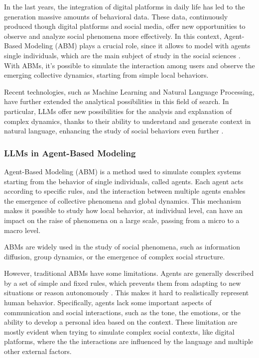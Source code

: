 In the last years, the integration of digital platforms in daily life has led to the generation massive amounts of behavioral data.
These data, continuously produced though digital platforms and social media, offer new opportunities to observe and analyze social phenomena more effectively.
In this context, Agent-Based Modeling (ABM) plays a crucial role, since it allows to model with agents single individuals, which are the main subject of study in the social sciences \cite{conte2012manifesto}.
With ABMs, it's possible to simulate the interaction among users and observe the emerging collective dynamics, starting from simple local behaviors.

Recent technologies, such as Machine Learning and Natural Language Processing, have further extended the analytical possibilities in this field of search.
In particular, LLMs offer new possibilities for the analysis and explanation of complex dynamics, thanks to their ability to understand and generate context in natural language, enhancing the study of social behaviors even further \cite{thapa2025llm}.


\subsubsection{LLMs in Agent-Based Modeling}
Agent-Based Modeling (ABM) is a method used to simulate complex systems starting from the behavior of single individuals, called agents.
Each agent acts according to specific rules, and the interaction between multiple agents enables the emergence of collective phenomena and global dynamics.
This mechanism makes it possible to study how local behavior, at individual level, can have an impact on the raise of phenomena on a large scale, passing from a micro to a macro level.

ABMs are widely used in the study of social phenomena, such as information diffusion, group dynamics, or the emergence of complex social structure.

\medskip
However, traditional ABMs have some limitations.
Agents are generally described by a set of simple and fixed rules, which prevents them from adapting to new situations or reason autonomously \cite{conte2014agent, törnberg2023evaluate}.
This makes it hard to realistically represent human behavior. Specifically, agents lack some important aspects of communication and social interactions, such as the tone, the emotions, or the ability to develop a personal idea based on the context.
These limitation are mostly evident when trying to simulate complex social contexts, like digital platforms, where the the interactions are influenced by the language and multiple other external factors.

